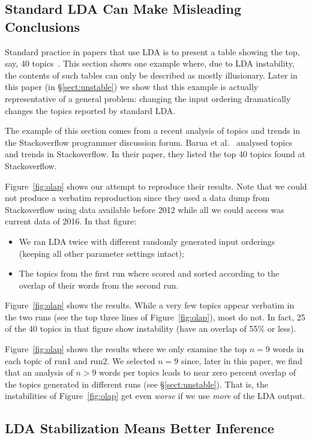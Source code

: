 \documentclass[twocolumn,5p,sort&compress]{elsarticle}
\newcommand{\tion}[1]{{\S}\ref{sect:#1}}
\newcommand{\fig}[1]{Figure~\ref{fig:#1}}
\newcommand{\bi}{\begin{itemize}}
\newcommand{\ei}{\end{itemize}}
\theoremstyle{break}
\begin{document}
\subsection{Standard LDA Can Make Misleading Conclusions}
Standard practice in papers that use LDA is to present a table showing the top, say, 40
topics~\cite{barua2014developers}.
This section shows one example where, due to LDA instability,
the contents of such tables can only be described as  mostly illusionary.
Later in this paper (in \tion{unstable}) we show that this example is actually representative of
a general problem: changing the input ordering dramatically changes the topics
reported by standard LDA.

The example of this section comes from a recent analysis
of topics and trends in the Stackoverflow programmer discussion forum.
Barua et al.~\cite{barua2014developers}
analysed topics and trends in Stackoverflow. In their paper,
they listed the top
40 topics found at Stackoverflow.

\fig{olap} shows our attempt to reproduce their results.
Note that we could not produce a verbatim reproduction since
they used a 
data dump from
Stackoverflow using data available before 2012 while all we could access was current data of 2016.
In that figure:
\bi
\item
  We ran LDA twice with different
randomly generated input orderings (keeping all other parameter settings intact);
\item
  The topics from the first run where scored and sorted
according to the overlap of their words
from the second run.
\ei
\fig{olap} shows the results.
While
a very few topics appear verbatim in the two runs (see the top three lines of \fig{olap}),
most do not. In fact,
25 of the 40 topics in that figure show  instability (have an overlap of 55\% or less).

\fig{olap} shows the results where we only
examine the top $n=9$ words in each topic of run1 and run2. We selected \mbox{$n=9$} since,
later in this paper, we find that an analysis of \mbox{$n>9$} words per topics leads to near
 zero percent overlap of the topics generated in different runs (see \tion{unstable}).
That is, the instabilities of \fig{olap} get even {\em worse} if we use {\em more} of the LDA output.

\subsection{LDA Stabilization Means Better Inference}
\end{document}
